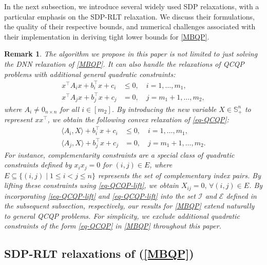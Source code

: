 \documentclass[11pt]{article}
\theoremstyle{plain}
\newtheorem{remark}{Remark}
\def\E{\mathcal{E}}
\def\I{\mathcal{I}}
\def\S{\mathbb{S}}
\begin{document}
In the next subsection, we introduce several widely used SDP relaxations, with a particular emphasis on the SDP-RLT relaxation. We discuss their formulations, the quality of their respective bounds, and numerical challenges associated with their implementation in deriving tight lower bounds for \eqref{MBQP}.


\begin{remark}\label{remark-QCQP}
The algorithm we propose in this paper is not limited to just solving the DNN relaxation of \eqref{MBQP}. 
It can also handle the relaxations of QCQP problems 
with additional general quadratic constraints:
%
\begin{equation}\label{eq-QCQP}
\begin{aligned}
x^\top A_i x + b_i^\top x + c_i &\leq 0, \quad i=1,\dots,m_1, \\
x^\top A_j x + b_j^\top x + c_j &= 0,     \quad j=m_1+1,\dots,m_2,
\end{aligned}
\end{equation}
%
where $A_i\not=0_{n\times n}$ for all $i\in[m_2]$. By introducing the new variable $X\in \S^{n}_+$ to represent $xx^\top$, we obtain the following convex relaxation of \eqref{eq-QCQP}:
%
\begin{align}
    \langle A_i, X \rangle + b_i^\top x + c_i &\leq 0, \quad i = 1, \dots, m_1, \label{ieq-QCQP-lift} \\
    \langle A_j, X \rangle + b_j^\top x + c_j &= 0, \quad j = m_1 + 1, \dots, m_2. \label{eq-QCQP-lift}
\end{align}
%
For instance, complementarity constraints are a special class of quadratic constraints defined by $x_ix_j = 0$ for $(i,j) \in E$, where $E \subseteq \{(i,j) \mid 1 \leq i < j \leq n\}$ represents the set of 
complementary index pairs. By lifting these constraints using \eqref{eq-QCQP-lift}, we obtain $X_{ij}=0,\, \forall (i,j)\in E$.
By incorporating \eqref{ieq-QCQP-lift} and \eqref{eq-QCQP-lift} into the set $\I$ and $\E$ defined in the subsequent subsection, respectively, our results for \eqref{MBQP} extend naturally to general QCQP problems.
For simplicity, we exclude additional quadratic constraints of the form \eqref{eq-QCQP} in \eqref{MBQP} throughout this paper.
\end{remark}





\subsection{SDP-RLT relaxations of (\ref{MBQP})}\label{subsec-SDPRLT}
\end{document}
